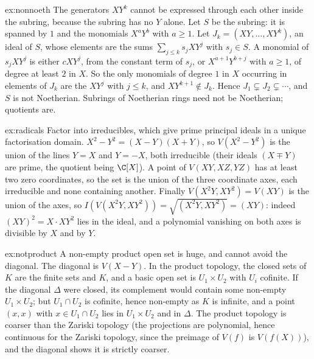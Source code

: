 \begin{solution}{ex:nonnoeth}
\idea The generators $XY^k$ cannot be expressed through each other inside the subring, because the subring has no $Y$ alone.
\writeup Let $S$ be the subring: it is spanned by $1$ and the monomials $X^aY^b$ with $a\ge1$. Let $J_k=(XY,\dots,XY^k)$, an ideal of $S$, whose elements are the sums $\sum_{j\le k}s_jXY^j$ with $s_j\in S$. A monomial of $s_jXY^j$ is
either $cXY^j$, from the constant term of $s_j$, or $X^{a+1}Y^{b+j}$ with $a\ge1$, of degree at least $2$ in $X$. So the only monomials of degree $1$ in $X$ occurring in elements of $J_k$ are the $XY^j$ with $j\le k$, and
$XY^{k+1}\notin J_k$. Hence $J_1\subsetneq J_2\subsetneq\cdots$, and $S$ is not Noetherian. Subrings of Noetherian rings need not be Noetherian; quotients are.
\end{solution}

\begin{solution}{ex:radicals}
\idea Factor into irreducibles, which give prime principal ideals in a unique factorisation domain.
\writeup $X^2-Y^2=(X-Y)(X+Y)$, so $V(X^2-Y^2)$ is the union of the lines $Y=X$ and $Y=-X$, both irreducible (their ideals $(X\mp Y)$ are prime, the quotient being $\C[X]$). A point of $V(XY,XZ,YZ)$ has at least two zero
coordinates, so the set is the union of the three coordinate axes, each irreducible and none containing another. Finally $V(X^2Y,XY^2)=V(XY)$ is the union of the axes, so $I(V(X^2Y,XY^2))=\sqrt{(X^2Y,XY^2)}=(XY)$: indeed $(XY)^2=X\cdot XY^2$
lies in the ideal, and a polynomial vanishing on both axes is divisible by $X$ and by $Y$.
\end{solution}

\begin{solution}{ex:notproduct}
\idea A non-empty product open set is huge, and cannot avoid the diagonal.
\writeup The diagonal is $V(X-Y)$. In the product topology, the closed sets of $K$ are the finite sets and $K$, and a basic open set is $U_1\times U_2$ with $U_i$ cofinite. If the diagonal $\Delta$ were closed, its complement would contain
some non-empty $U_1\times U_2$; but $U_1\cap U_2$ is cofinite, hence non-empty as $K$ is infinite, and a point $(x,x)$ with $x\in U_1\cap U_2$ lies in $U_1\times U_2$ and in $\Delta$. The product topology is coarser than the Zariski
topology (the projections are polynomial, hence continuous for the Zariski topology, since the preimage of $V(f)$ is $V(f(X))$), and the diagonal shows it is strictly coarser.
\end{solution}

